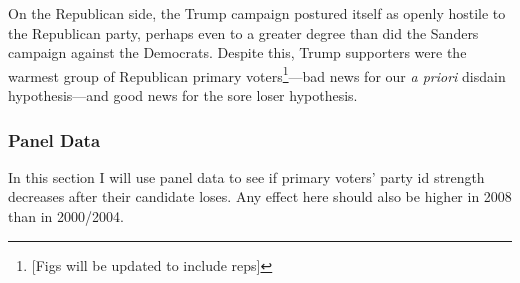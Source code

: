 \documentclass[12pt]{paper}
\begin{document}
On the Republican side, the Trump campaign postured itself as openly hostile to the Republican party, perhaps even to a greater degree than did the Sanders campaign against the Democrats. Despite this, Trump supporters were the warmest group of Republican primary voters\footnote{[Figs will be updated to include reps]}---bad news for our \textit{a priori} disdain hypothesis---and good news for the sore loser hypothesis.

\subsubsection{Panel Data}
In this section I will use panel data to see if primary voters' party id strength decreases after their candidate loses. Any effect here should also be higher in 2008 than in 2000/2004.



\end{document}
